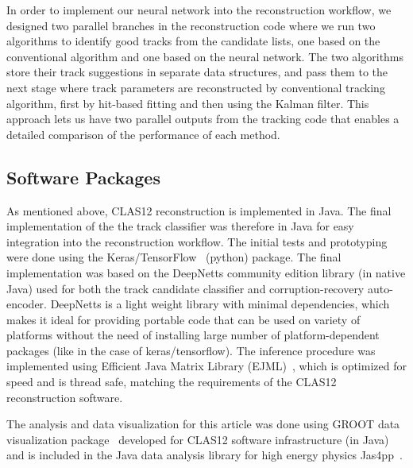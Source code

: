 In order to implement our neural network into the reconstruction workflow, we designed two parallel 
branches in the reconstruction code where we run two algorithms to identify good tracks from the 
candidate lists, one based on the conventional algorithm and one based on the neural network. The two 
algorithms store their track suggestions in separate data structures, and pass them to the next stage where 
track parameters are reconstructed by conventional tracking algorithm, first by hit-based fitting and then 
using the Kalman filter. This approach lets us have two parallel outputs from the tracking code that enables 
a detailed comparison of the performance of each method.

\subsection{Software Packages}

As mentioned above, CLAS12 reconstruction is implemented in Java. The final implementation of the the 
track classifier was therefore in Java for easy integration into the reconstruction workflow. The initial tests 
and prototyping were done using the Keras/TensorFlow~\cite{keras-website} (python) package. The final 
implementation was based on the DeepNetts \cite{Sevarac.Z} community edition library (in native Java) 
used for both the track candidate classifier and corruption-recovery auto-encoder. DeepNetts is a light weight
 library with minimal dependencies, which makes it ideal for providing portable code that can be used on variety 
 of platforms without the need of installing large number of platform-dependent packages (like in the case of
  keras/tensorflow). The inference procedure was implemented using Efficient Java Matrix Library (EJML)~\cite{ejml:2021}, 
  which is optimized for speed and is thread safe, matching the requirements of the CLAS12 reconstruction software.

The analysis and data visualization for this article was done using GROOT data visualization package~\cite{groot-github} 
developed for CLAS12 software infrastructure (in Java) and is included in the Java data analysis library for high energy 
physics Jas4pp~\cite{Chekanov:2020bja}.
